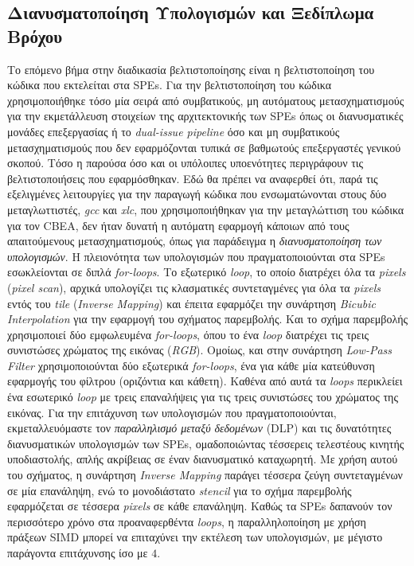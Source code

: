 \subsection[4.2.2 Διανυσματοποίηση Υπολογισμών και Ξεδίπλωμα Βρόχου]{Διανυσματοποίηση Υπολογισμών και Ξεδίπλωμα Βρόχου}
\label{subsection:sub422}
\indent
Το επόμενο βήμα στην διαδικασία βελτιστοποίησης είναι η βελτιστοποίηση του κώδικα που εκτελείται στα \acp{SPE}. Για την βελτιστοποίηση του κώδικα χρησιμοποιήθηκε τόσο μία σειρά από συμβατικούς, μη αυτόματους μετασχηματισμούς για την εκμετάλλευση στοιχείων της αρχιτεκτονικής των \acp{SPE} όπως οι διανυσματικές μονάδες επεξεργασίας ή το \textsl{dual-issue pipeline} όσο και μη συμβατικούς μετασχηματισμούς που δεν εφαρμόζονται τυπικά σε βαθμωτούς επεξεργαστές γενικού σκοπού. Τόσο η παρούσα όσο και οι υπόλοιπες υποενότητες περιγράφουν τις βελτιστοποιήσεις που εφαρμόσθηκαν. Εδώ θα πρέπει να αναφερθεί ότι, παρά τις εξελιγμένες λειτουργίες για την παραγωγή κώδικα που ενσωματώνονται στους δύο μεταγλωττιστές, \textsl{gcc} και \textsl{xlc}, που χρησιμοποιήθηκαν για την μεταγλώττιση του κώδικα για τον \ac{CBEA}, δεν ήταν δυνατή η αυτόματη εφαρμογή κάποιων από τους απαιτούμενους μετασχηματισμούς, όπως για παράδειγμα η \textsl{διανυσματοποίηση των υπολογισμών}.\newline \indent
Η πλειονότητα των υπολογισμών που πραγματοποιούνται στα \acp{SPE} εσωκλείονται σε διπλά \textsl{for-loops}. Το εξωτερικό \textsl{loop}, το οποίο διατρέχει όλα τα \textsl{pixels} (\textsl{pixel scan}), αρχικά υπολογίζει τις κλασματικές συντεταγμένες για όλα τα \textsl{pixels} εντός του \textsl{tile} (\textsl{Inverse Mapping}) και έπειτα εφαρμόζει την συνάρτηση \textsl{Bicubic Interpolation} για την εφαρμογή του σχήματος παρεμβολής. Και το σχήμα παρεμβολής χρησιμοποιεί δύο εμφωλευμένα \textsl{for-loops}, όπου το ένα \textsl{loop} διατρέχει τις τρεις συνιστώσες χρώματος της εικόνας (\textsl{RGB}). Ομοίως, και στην συνάρτηση \textsl{Low-Pass Filter} χρησιμοποιούνται δύο εξωτερικά \textsl{for-loops}, ένα για κάθε μία κατεύθυνση εφαρμογής του φίλτρου (οριζόντια και κάθετη). Καθένα από αυτά τα \textsl{loops} περικλείει ένα εσωτερικό \textsl{loop} με τρεις επαναλήψεις για τις τρεις συνιστώσες του χρώματος της εικόνας.\newline \indent
Για την επιτάχυνση των υπολογισμών που πραγματοποιούνται, εκμεταλλευόμαστε τον \textsl{παραλληλισμό μεταξύ δεδομένων} (\ac{DLP}) και τις δυνατότητες διανυσματικών υπολογισμών των \acp{SPE}, ομαδοποιώντας τέσσερεις τελεστέους κινητής υποδιαστολής, απλής ακρίβειας σε έναν διανυσματικό καταχωρητή. Με χρήση αυτού του σχήματος, η συνάρτηση \textsl{Inverse Mapping} παράγει τέσσερα ζεύγη συντεταγμένων σε μία επανάληψη, ενώ το μονοδιάστατο \textsl{stencil} για το σχήμα παρεμβολής εφαρμόζεται σε τέσσερα \textsl{pixels} σε κάθε επανάληψη. Καθώς τα \acp{SPE} δαπανούν τον περισσότερο χρόνο  στα προαναφερθέντα \textsl{loops}, η παραλληλοποίηση με χρήση πράξεων \ac{SIMD} μπορεί να επιταχύνει την εκτέλεση των υπολογισμών, με μέγιστο παράγοντα επιτάχυνσης ίσο με \(4\).\newline \indent
